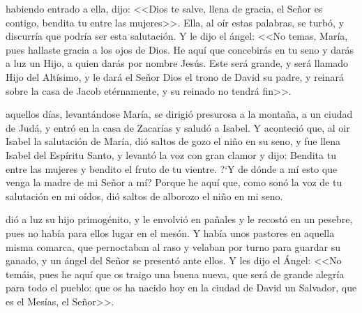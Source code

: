 \documentclass[10pt,twoside]{book}
\begin{document}
\vspace{4mm}

\noindent{}
\space habiendo entrado a ella, dijo: <<Dios te salve, llena de gracia, el Señor es contigo, bendita tu entre las mujeres>>. Ella, al oír estas palabras, se turbó,
y discurría que podría ser esta salutación. Y le dijo el ángel: <<No temas, María, pues hallaste gracia a los ojos de Dios. He aquí que concebirás en tu seno y darás a luz un Hijo,
a quien darás por nombre Jesús. Este será grande, y será llamado Hijo del Altísimo, y le dará el Señor Dios el trono de David su padre, y reinará sobre la casa de Jacob etérnamente, 
y su reinado no tendrá fin>>.

\vspace{2mm}



\vspace{5mm}

\noindent{}
aquellos días, levantándose María, se dirigió presurosa a la montaña, a un ciudad de Judá, y entró en la casa de Zacarías y saludó a Isabel.
Y aconteció que, al oir Isabel la salutación de María, dió saltos de gozo el niño en su seno, y fue llena Isabel del Espíritu Santo, y levantó la voz con gran clamor y dijo:
Bendita tu entre las mujeres y bendito el fruto de tu vientre. {?`}Y de dónde a mí esto que venga la madre de mi Señor a mí? Porque he aquí que, como sonó la voz de tu salutación en mi oídos,
dió saltos de alborozo el niño en mi seno.

\vspace{2mm}



\vspace{5mm}

\noindent{}
\space dió a luz su hijo primogénito, y le envolvió en pañales y le recostó en un pesebre, pues no había para ellos lugar en el mesón.
Y había unos pastores en aquella misma comarca, que pernoctaban al raso y velaban por turno para guardar su ganado, y un ángel del Señor se presentó ante ellos.
Y les dijo el Ángel: <<No temáis, pues he aquí que os traigo una buena nueva, que será de grande alegría para todo el pueblo: 
que os ha nacido hoy en la ciudad de David un Salvador, que es el Mesías, el Señor>>.
\end{document}

